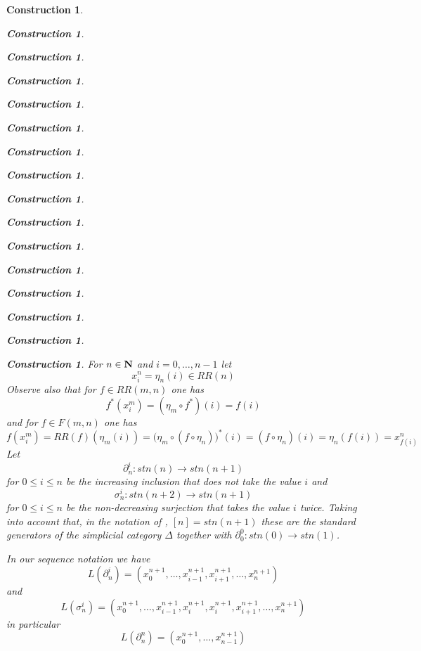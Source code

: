 \documentclass[12pt]{amsart}
\newenvironment{eq}{\begin{equation}}{\end{equation}}
\newtheorem{construction}[proposition]{Construction}
\newcommand{\llabel}[1]{\label{#1}}
\newcommand{\sr}{\rightarrow}
\newcommand{\nn}{{\bf N\rm}}
\newcommand{\nat}{\nn}
\newcommand{\mbind}[1]{{#1^*}}
\begin{document}
\begin{construction}
\begin{construction}
\begin{construction}
\begin{construction}
\begin{construction}
\begin{construction}
\begin{construction}
\begin{construction}
\begin{construction}
\begin{construction}
\begin{construction}
\begin{construction}
\begin{construction}
\begin{construction}
\begin{construction}
\begin{construction}
%
For $n\in\nat$ and $i=0,\dots,n-1$ let
%
$$x_i^n=\eta_{n}(i)\in RR(n)$$
%
Observe also that for $f\in RR(m,n)$ one has
%
\begin{eq}\llabel{2015.08.24.eq5}
\mbind{f}(x_i^m)=(\eta_{m}\circ\mbind{f})(i)=f(i)
\end{eq}%
%
and for $f\in F(m,n)$ one has
%
\begin{eq}\llabel{2016.01.15.eq1}
f(x_i^m)=RR(f)(\eta_{m}(i))=(\eta_{m}\circ \mbind{(f\circ \eta_{n}))}(i)=(f\circ \eta_{n})(i)=\eta_{n}(f(i))=x_{f(i)}^n
\end{eq}%
%
Let 
%
$$\partial^{i}_{n}:stn(n)\sr stn(n+1)$$
%
for $0\le i\le n$ be the increasing inclusion that does not take the value $i$ and
%
$$\sigma^{i}_{n}:stn(n+2)\sr stn(n+1)$$
%
for $0\le i\le n$ be the non-decreasing surjection that takes the value $i$
twice. Taking into account that, in the notation of \cite{GabZis},
$[n]=stn(n+1)$ these are the standard generators of the simplicial category
$\Delta$ together with $\partial^0_0:stn(0)\sr stn(1)$.

In our sequence notation we have
%
\begin{eq}\llabel{2015.08.24.eq7}
L(\partial^{i}_{n})=(x_0^{n+1},\dots,x_{i-1}^{n+1},x_{i+1}^{n+1},\dots,x_n^{n+1})
\end{eq}%
%
and
%
\begin{eq}\llabel{2015.08.24.eq8}
L(\sigma^{i}_{n})=(x_0^{n+1},\dots,x_{i-1}^{n+1},x_i^{n+1},x_i^{n+1},x_{i+1}^{n+1},\dots,x_n^{n+1})
\end{eq}%
%
in particular
%
\begin{eq}\llabel{2015.07.12.eq5}
L(\partial^{n}_n)=(x_0^{n+1},\dots,x_{n-1}^{n+1})
\end{eq}%
%


\end{construction}
\end{construction}
\end{construction}
\end{construction}
\end{construction}
\end{construction}
\end{construction}
\end{construction}
\end{construction}
\end{construction}
\end{construction}
\end{construction}
\end{construction}
\end{construction}
\end{construction}
\end{construction}
\end{document}
